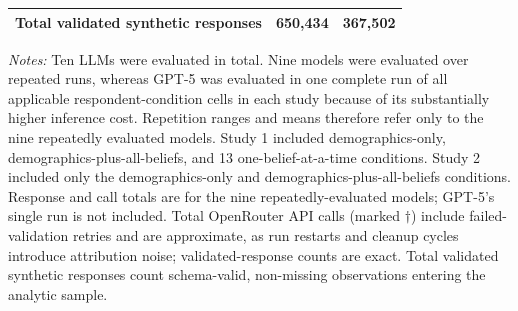 \begin{table}[h]
\begin{threeparttable}
\begin{tabular}{lcc}
            Total validated synthetic responses
                & 650{,}434
                & 367{,}502 \\

            \bottomrule
        \end{tabular}

        \begin{tablenotes}\footnotesize
            \item \textit{Notes:}
            Ten LLMs were evaluated in total. Nine models were evaluated
            over repeated runs, whereas GPT-5 was evaluated in one complete
            run of all applicable respondent-condition cells in each study
            because of its substantially higher inference cost. Repetition
            ranges and means therefore refer only to the nine repeatedly
            evaluated models. Study 1 included demographics-only,
            demographics-plus-all-beliefs, and 13 one-belief-at-a-time
            conditions. Study 2 included only the demographics-only and
            demographics-plus-all-beliefs conditions. Response and call totals are for the nine repeatedly-evaluated models; GPT-5's single run is not included. Total OpenRouter API calls (marked $\dagger$) include failed-validation retries and
            are approximate, as run restarts and cleanup cycles introduce attribution noise; validated-response counts are exact. Total validated synthetic responses count schema-valid, non-missing observations entering the analytic sample.
        \end{tablenotes}
    \end{threeparttable}
\end{table}